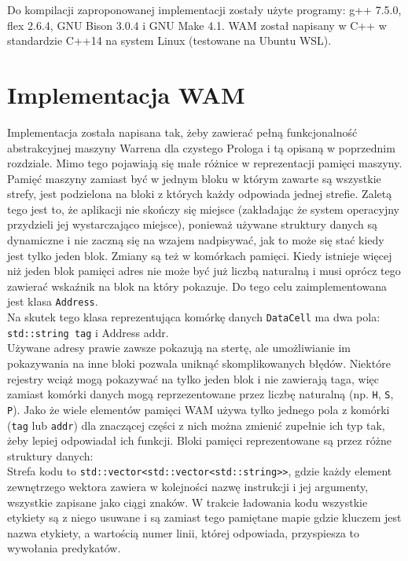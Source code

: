 Do kompilacji zaproponowanej implementacji zostały użyte programy: g++ 7.5.0, flex 2.6.4, GNU Bison 3.0.4 i GNU Make 4.1. WAM został napisany w C++ w standardzie C++14 na system Linux (testowane na Ubuntu WSL).\\

\section{Implementacja WAM}

Implementacja została napisana tak, żeby zawierać pełną funkcjonalność abstrakcyjnej maszyny Warrena dla czystego Prologa i tą opisaną w poprzednim rozdziale. Mimo tego pojawiają się małe różnice w reprezentacji pamięci maszyny.\\

Pamięć maszyny zamiast być w jednym bloku w którym zawarte są wszystkie strefy\cite{instructions}, jest podzielona na bloki z których każdy odpowiada jednej strefie. Zaletą tego jest to, że aplikacji nie skończy się miejsce (zakładając że system operacyjny przydzieli jej wystarczająco miejsce), ponieważ używane struktury danych są dynamiczne i nie zaczną się na wzajem nadpisywać, jak to może się stać kiedy jest tylko jeden blok. Zmiany są też w komórkach pamięci. Kiedy istnieje więcej niż jeden blok pamięci adres nie może być już liczbą naturalną i musi oprócz tego zawierać wskaźnik na blok na który pokazuje. Do tego celu zaimplementowana jest klasa \texttt{Address}.\\
Na skutek tego klasa reprezentująca komórkę danych \texttt{DataCell} ma dwa pola: \texttt{std::string tag} i {Address addr}.\\
 Używane adresy prawie zawsze pokazują na stertę, ale umożliwianie im pokazywania na inne bloki pozwala uniknąć skomplikowanych błędów. Niektóre rejestry wciąż mogą pokazywać na tylko jeden blok i nie zawierają taga, więc zamiast komórki danych mogą reprzezentowane przez liczbę naturalną (np. \texttt{H}, \texttt{S}, \texttt{P}). Jako że wiele elementów pamięci WAM używa tylko jednego pola z komórki (\texttt{tag} lub \texttt{addr}) dla znaczącej części z nich można zmienić zupełnie ich typ tak, żeby lepiej odpowiadał ich funkcji. Bloki pamięci reprezentowane są przez różne struktury danych:\\
Strefa kodu to \texttt{std::vector<std::vector<std::string>>}, gdzie każdy element zewnętrzego wektora zawiera w kolejności nazwę instrukcji i jej argumenty, wszystkie zapisane jako ciągi znaków. W trakcie ładowania kodu wszystkie etykiety są z niego usuwane i są zamiast tego pamiętane mapie gdzie kluczem jest nazwa etykiety, a wartością numer linii, której odpowiada, przyspiesza to wywołania predykatów.\\
